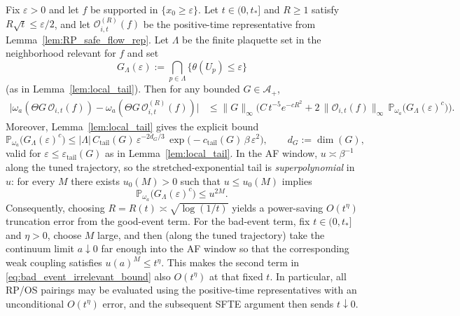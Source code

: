 \begin{lemma}\label{lem:bad_event_irrelevant}
Fix $\varepsilon>0$ and let $f$ be supported in $\{x_0\ge\varepsilon\}$.
Let $t\in(0,t_\ast]$ and $R\ge 1$ satisfy $R\sqrt t\le\varepsilon/2$, and let $\mathcal O^{(R)}_{i,t}(f)$ be the positive-time representative from
Lemma~\ref{lem:RP_safe_flow_rep}.
Let $\Lambda$ be the finite plaquette set in the neighborhood relevant for $f$ and set
\[
G_{\Lambda}(\varepsilon):=\bigcap_{p\in\Lambda}\{\theta(U_p)\le\varepsilon\}
\]
(as in Lemma~\ref{lem:local_tail}).
Then for any bounded $G\in\mathcal A_+$,
\begin{align}\label{eq:bad_event_irrelevant_bound}
\big|\omega_a(\Theta G\,\mathcal O_{i,t}(f)) - \omega_a(\Theta G\,\mathcal O^{(R)}_{i,t}(f))\big|
&\le \|G\|_\infty\Big( C\,t^{-5}e^{-cR^2} + 2\,\|\mathcal O_{i,t}(f)\|_\infty\,\mathbb P_{\omega_a}\big(G_{\Lambda}(\varepsilon)^c\big)\Big).
\end{align}
Moreover, Lemma~\ref{lem:local_tail} gives the explicit bound
\[
\mathbb P_{\omega_a}\big(G_{\Lambda}(\varepsilon)^c\big)
\le |\Lambda|\,C_{\mathrm{tail}}(G)\,\varepsilon^{-2d_G/3}\,\exp\big(-c_{\mathrm{tail}}(G)\,\beta\,\varepsilon^2\big),
\qquad d_G:=\dim(G),
\]
valid for $\varepsilon\le \varepsilon_{\mathrm{tail}}(G)$ as in Lemma~\ref{lem:local_tail}.
In the AF window, $u\asymp \beta^{-1}$ along the tuned trajectory, so the stretched-exponential tail is \emph{superpolynomial} in $u$:
for every $M$ there exists $u_0(M)>0$ such that $u\le u_0(M)$ implies
\begin{equation}\label{eq:bad_event_prob_superpoly}
\mathbb P_{\omega_a}\big(G_{\Lambda}(\varepsilon)^c\big)\le u^{2M}.
\end{equation}
Consequently, choosing $R=R(t)\asymp\sqrt{\log(1/t)}$ yields a power-saving $O(t^{\eta})$ truncation error from the good-event term.
For the bad-event term, fix $t\in(0,t_\ast]$ and $\eta>0$, choose $M$ large, and then (along the tuned trajectory) take the continuum limit $a\downarrow 0$
far enough into the AF window so that the corresponding weak coupling satisfies $u(a)^M\le t^{\eta}$.
This makes the second term in \eqref{eq:bad_event_irrelevant_bound} also $O(t^{\eta})$ at that fixed $t$.
In particular, all RP/OS pairings may be evaluated using the positive-time representatives with an unconditional $O(t^{\eta})$ error,
and the subsequent SFTE argument then sends $t\downarrow 0$.
\end{lemma}

